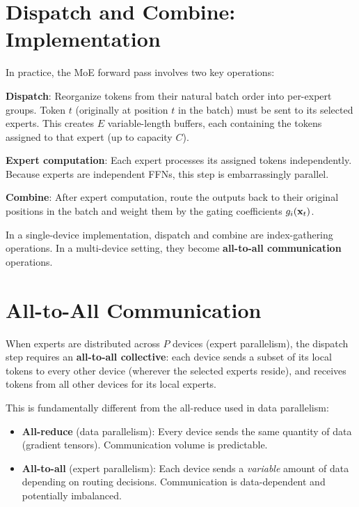 \section{Dispatch and Combine: Implementation}
\label{ch:13:sec:dispatch}

In practice, the MoE forward pass involves two key operations:

\textbf{Dispatch}: Reorganize tokens from their natural batch order into per-expert groups. Token $t$ (originally at position $t$ in the batch) must be sent to its selected experts. This creates $E$ variable-length buffers, each containing the tokens assigned to that expert (up to capacity $C$).

\textbf{Expert computation}: Each expert processes its assigned tokens independently. Because experts are independent FFNs, this step is embarrassingly parallel.

\textbf{Combine}: After expert computation, route the outputs back to their original positions in the batch and weight them by the gating coefficients $g_i(\mathbf{x}_t)$.

In a single-device implementation, dispatch and combine are index-gathering operations. In a multi-device setting, they become \textbf{all-to-all communication} operations.

\section{All-to-All Communication}
\label{ch:13:sec:alltoall}

When experts are distributed across $P$ devices (expert parallelism), the dispatch step requires an \textbf{all-to-all collective}: each device sends a subset of its local tokens to every other device (wherever the selected experts reside), and receives tokens from all other devices for its local experts.

This is fundamentally different from the all-reduce used in data parallelism:
\begin{itemize}
  \item \textbf{All-reduce} (data parallelism): Every device sends the same quantity of data (gradient tensors). Communication volume is predictable.
  \item \textbf{All-to-all} (expert parallelism): Each device sends a \emph{variable} amount of data depending on routing decisions. Communication is data-dependent and potentially imbalanced.
\end{itemize}

